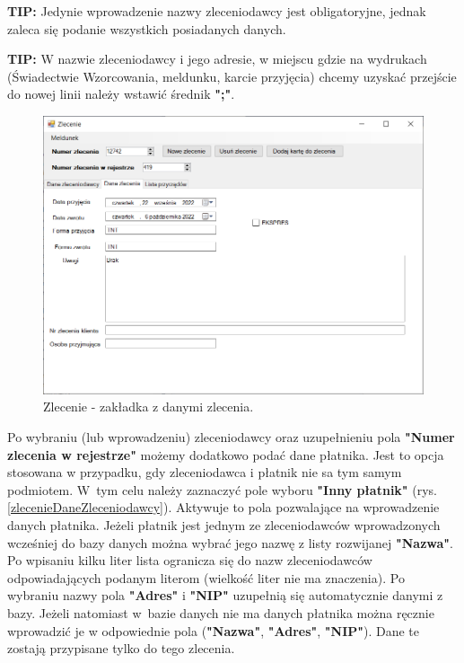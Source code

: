 \textbf{TIP:} Jedynie wprowadzenie nazwy zleceniodawcy jest obligatoryjne, jednak zaleca się podanie wszystkich posiadanych danych.

\textbf{TIP:} W nazwie zleceniodawcy i jego adresie, w miejscu gdzie na wydrukach (Świadectwie Wzorcowania, meldunku, karcie przyjęcia) chcemy uzyskać przejście do nowej linii należy wstawić średnik \textbf{";"}. 

\begin{figure}[htb]
	\centering
	\includegraphics[width=\columnwidth]{obrazki/Biuro/zlecenie/zlecenie_dane_zlecenia.png}
	\caption{Zlecenie - zakładka z danymi zlecenia.}
	\label{zlecenieDaneZlecenia}
\end{figure}

Po wybraniu (lub wprowadzeniu) zleceniodawcy oraz uzupełnieniu pola \textbf{"Numer zlecenia w rejestrze"} możemy dodatkowo podać dane płatnika. Jest to opcja stosowana w przypadku, gdy zleceniodawca i płatnik nie sa tym samym podmiotem. W~tym celu należy zaznaczyć pole wyboru \textbf{"Inny płatnik"} (rys. \ref{zlecenieDaneZleceniodawcy}). Aktywuje to pola pozwalające na wprowadzenie danych płatnika. Jeżeli płatnik jest jednym ze zleceniodawców wprowadzonych wcześniej do bazy danych można wybrać jego nazwę z listy rozwijanej \textbf{"Nazwa"}. Po wpisaniu kilku liter lista ogranicza się do nazw zleceniodawców odpowiadających podanym literom (wielkość liter nie ma znaczenia). Po wybraniu nazwy pola \textbf{"Adres"} i \textbf{"NIP"} uzupełnią się automatycznie danymi z bazy. Jeżeli natomiast w~bazie danych nie ma danych płatnika można ręcznie wprowadzić je w odpowiednie pola (\textbf{"Nazwa"}, \textbf{"Adres"}, \textbf{"NIP"}). Dane te zostają przypisane tylko do tego zlecenia.

